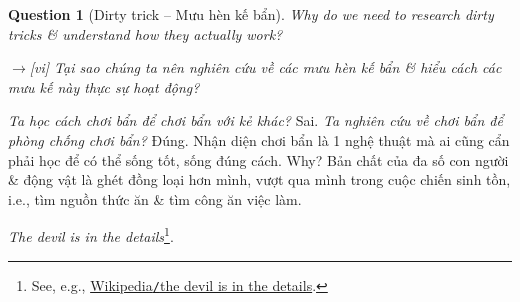 \documentclass[12pt,oneside]{book}
\newtheorem{question}{Question}
\begin{document}
\begin{question}[Dirty trick -- Mưu hèn kế bẩn]
	Why do we need to research dirty tricks \& understand how they actually work?
	
	{\sf[en]$\to$[vi]} Tại sao chúng ta nên nghiên cứu về các mưu hèn kế bẩn \& hiểu cách các mưu kế này thực sự hoạt động?
\end{question}
{\it Ta học cách chơi bẩn để chơi bẩn với kẻ khác?} Sai. {\it Ta nghiên cứu về chơi bẩn để phòng chống chơi bẩn?} Đúng. Nhận diện chơi bẩn là 1 nghệ thuật mà ai cũng cẩn phải học để có thể sống tốt, sống đúng cách. Why? Bản chất của đa số con người \& động vật là ghét đồng loại hơn mình, vượt qua mình trong cuộc chiến sinh tồn, i.e., tìm nguồn thức ăn \& tìm công ăn việc làm.


{\it The devil is in the details}\footnote{See, e.g., \href{https://en.wikipedia.org/wiki/The_devil_is_in_the_details}{Wikipedia{\tt/}the devil is in the details}.}.
\end{document}

